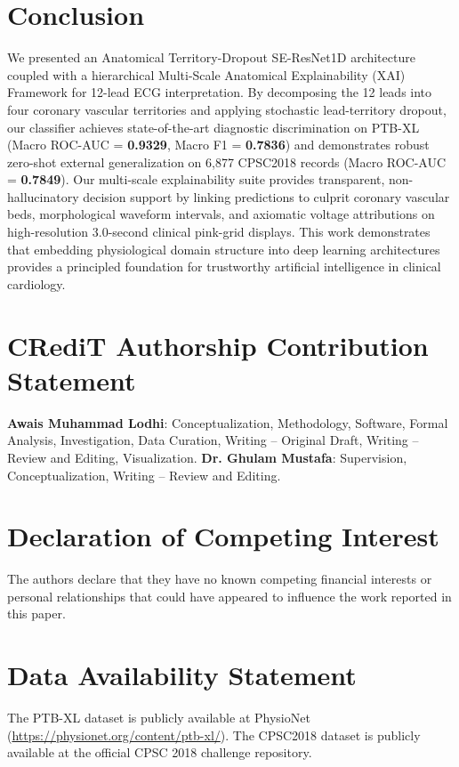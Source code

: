\documentclass[12pt]{elsarticle}
\begin{document}
\section{Conclusion}
\label{sec:conclusion}
We presented an Anatomical Territory-Dropout SE-ResNet1D architecture coupled with a hierarchical Multi-Scale Anatomical Explainability (XAI) Framework for 12-lead ECG interpretation. By decomposing the 12 leads into four coronary vascular territories and applying stochastic lead-territory dropout, our classifier achieves state-of-the-art diagnostic discrimination on PTB-XL (Macro ROC-AUC = \textbf{0.9329}, Macro F1 = \textbf{0.7836}) and demonstrates robust zero-shot external generalization on 6,877 CPSC2018 records (Macro ROC-AUC = \textbf{0.7849}). Our multi-scale explainability suite provides transparent, non-hallucinatory decision support by linking predictions to culprit coronary vascular beds, morphological waveform intervals, and axiomatic voltage attributions on high-resolution 3.0-second clinical pink-grid displays. This work demonstrates that embedding physiological domain structure into deep learning architectures provides a principled foundation for trustworthy artificial intelligence in clinical cardiology.

\section*{CRediT Authorship Contribution Statement}
\textbf{Awais Muhammad Lodhi}: Conceptualization, Methodology, Software, Formal Analysis, Investigation, Data Curation, Writing -- Original Draft, Writing -- Review and Editing, Visualization.
\textbf{Dr. Ghulam Mustafa}: Supervision, Conceptualization, Writing -- Review and Editing.

\section*{Declaration of Competing Interest}
The authors declare that they have no known competing financial interests or personal relationships that could have appeared to influence the work reported in this paper.

\section*{Data Availability Statement}
The PTB-XL dataset is publicly available at PhysioNet (\url{https://physionet.org/content/ptb-xl/}). The CPSC2018 dataset is publicly available at the official CPSC 2018 challenge repository.



\end{document}
